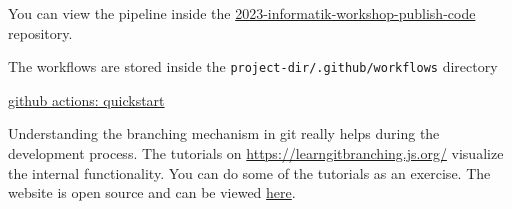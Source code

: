 \documentclass[paper=a4]{scrartcl}
\begin{document}
	\begin{hints}
		\item You can view the pipeline inside the \href{https://github.com/marc-philipp-knechtle/2023-informatik-workshop-publish-code}{2023-informatik-workshop-publish-code} repository. 
		\item The workflows are stored inside the \texttt{project-dir/.github/workflows} directory
	\end{hints}
	
	\begin{literature}
		\item \href{https://docs.github.com/en/actions/quickstart}{github actions: quickstart}
	\end{literature}




	Understanding the branching mechanism in git really helps during the development process. The tutorials on \url{https://learngitbranching.js.org/} visualize the internal functionality. You can do some of the tutorials as an exercise. 
	\newline The website is open source and can be viewed \href{https://github.com/pcottle/learnGitBranchin}{here}. 
\end{document}
